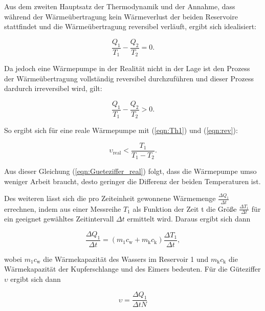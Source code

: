         Aus dem zweiten Hauptsatz der Thermodynamik und der Annahme, dass während der Wärmeübertragung kein Wärmeverlust der beiden Reservoire stattfindet
         und die Wärmeübertragung reversibel verläuft, ergibt sich idealisiert:

        \begin{equation}
            \frac{Q_1}{T_1} - \frac{Q_2}{T_2} = 0.
            \label{eqn:irev}
        \end{equation}
        
        Da jedoch eine Wärmepumpe in der Realität nicht in der Lage ist den Prozess der Wärmeübertragung vollständig reversibel durchzuführen und dieser Prozess dardurch irreversibel wird, gilt:

        \begin{equation}
            \frac{Q_1}{T_1} - \frac{Q_2}{T_2} > 0.
            \label{eqn:rev}
        \end{equation}

        So ergibt sich für eine reale Wärmepumpe mit (\ref{eqn:Th1}) und (\ref{eqn:rev}):

        \begin{equation}
            \upsilon_\text{real} < \frac{T_1}{T_1 - T_2}.
            \label{eqn:Gueteziffer_real}
        \end{equation}

        Aus dieser Gleichung (\ref{eqn:Gueteziffer_real}) folgt, dass die Wärmepumpe umso weniger Arbeit braucht, desto geringer die Differenz der beiden Temperaturen ist.

        Des weiteren lässt sich die pro Zeiteinheit gewonnene Wärmemenge $\frac{\Delta Q_1}{\Delta t}$ errechnen, 
        indem aus einer Messreihe $T_1$ als Funktion der Zeit t die Größe $\frac{\Delta T_1}{\Delta t}$ für ein geeignet gewähltes Zeitintervall $\Delta t$ ermittelt wird.
        Daraus ergibt sich dann 

        \begin{equation}
        \frac{\Delta Q_1}{\Delta t} = (m_1 c_\text{w} + m_\text{k} c_\text{k}) \frac{\Delta T_1}{\Delta t},
        \label{gueteziffer2}
        \end{equation}

        wobei $m_1 c_\text{w}$ die Wärmekapazität des Wassers im Reservoir 1 und $m_\text{k} c_\text{k}$ die Wärmekapazität der Kupferschlange und des Eimers bedeuten.
        Für die Güteziffer $\upsilon$ ergibt sich dann

        \begin{equation}
        \upsilon = \frac{\Delta Q_1}{\Delta t N}
        \label{eqn:gueteziffer3}
        \end{equation}

